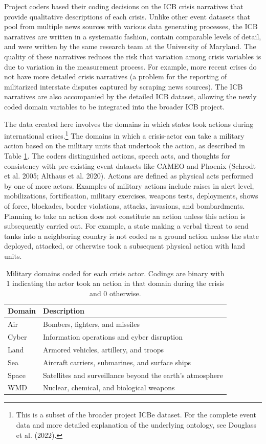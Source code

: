 \documentclass[
]{article}
\begin{document}
Project coders based their coding decisions on the ICB crisis narratives that provide qualitative descriptions of each crisis. Unlike other event datasets that pool from multiple news sources with various data generating processes, the ICB narratives are written in a systematic fashion, contain comparable levels of detail, and were written by the same research team at the University of Maryland. The quality of these narratives reduces the risk that variation among crisis variables is due to variation in the measurement process. For example, more recent crises do not have more detailed crisis narratives (a problem for the reporting of militarized interstate disputes captured by scraping news sources). The ICB narratives are also accompanied by the detailed ICB dataset, allowing the newly coded domain variables to be integrated into the broader ICB project.

The data created here involves the domains in which states took actions during international crises.\footnote{This is a subset of the broader project ICBe dataset. For the complete event data and more detailed explanation of the underlying ontology, see Douglass et al. (2022).} The domains in which a crisis-actor can take a military action based on the military units that undertook the action, as described in Table \ref{tab:domains}. The coders distinguished actions, speech acts, and thoughts for consistency with pre-existing event datasets like CAMEO and Phoenix (Schrodt et al. 2005; Althaus et al. 2020). Actions are defined as physical acts performed by one of more actors. Examples of military actions include raises in alert level, mobilizations, fortification, military exercises, weapons tests, deployments, shows of force, blockades, border violations, attacks, invasions, and bombardments. Planning to take an action does not constitute an action unless this action is subsequently carried out. For example, a state making a verbal threat to send tanks into a neighboring country is not coded as a ground action unless the state deployed, attacked, or otherwise took a subsequent physical action with land units.

\begin{table}[]
\caption{Military domains coded for each crisis actor. Codings are binary with 1 indicating the actor took an action in that domain during the crisis and 0 otherwise.}
\label{tab:domains}
\centering
\begin{tabular}{|l|l|}
\hline
\textbf{Domain} & \textbf{Description} \\
\hline
Air & Bombers, fighters, and missiles \\
Cyber & Information operations and cyber disruption \\
Land & Armored vehicles, artillery, and troops \\
Sea & Aircraft carriers, submarines, and surface ships \\
Space & Satellites and surveillance beyond the earth's atmosphere \\
WMD & Nuclear, chemical, and biological weapons \\ 
\hline
\end{tabular}
\end{table}
\end{document}

